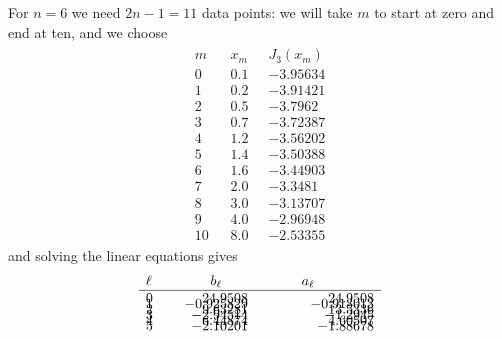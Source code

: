 \documentclass[preprint,12pt,eqsecnum,nofootinbib,amsmath,amssymb]{revtex4}
\begin{document}
\noindent
For $n=6$ we need $2n-1=11$ data points: we will take
$m$ to start at zero and end at ten, and we choose 
\begin{eqnarray}
\begin{array}{lll}
  m~~~~ & x_m~~~ & J_3(x_m)        \\ \hline
  0    & 0.1       &   -3.95634    \\[-8pt]
  1    & 0.2       &   -3.91421    \\[-8pt]
  2    & 0.5       &   -3.7962     \\[-8pt]
  3    & 0.7       &   -3.72387    \\[-8pt]
  4    & 1.2       &   -3.56202    \\[-8pt]
  5    & 1.4       &   -3.50388    \\[-8pt]
  6    & 1.6       &   -3.44903    \\[-8pt]
  7    & 2.0       &   -3.3481     \\[-8pt]
  8    & 3.0       &   -3.13707    \\[-8pt]
  9    & 4.0       &   -2.96948    \\[-8pt]
 10    & 8.0       &   -2.53355
\end{array}
\end{eqnarray}
%
and solving the linear equations gives
\begin{eqnarray}
  \begin{array}{lrr}
  \ell~~~~ & \hfill b_\ell \hfill & \hskip1cm a_\ell \hskip1.5cm  \\ \hline
  0    &    24.9508   &    24.9508      \\[-8pt]
  1    &  -0.925829   &  -0.913013      \\[-8pt]
  2    &    9.63281   &    13.5336      \\[-8pt]
  3    &   -2.94514   &    -1.2945      \\[-8pt]
  4    &    6.44874   &    4.60507      \\[-8pt]
  5    &   -2.10201   &   -1.88678      \\[-8pt]
  \end{array}
\end{eqnarray}
\end{document}
